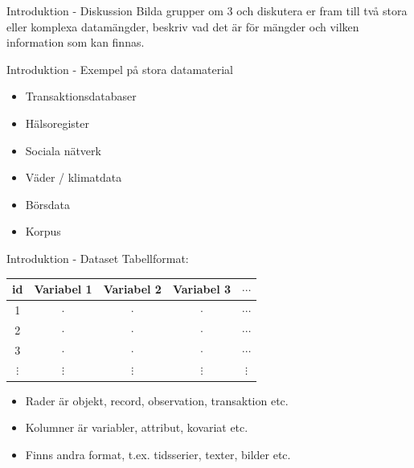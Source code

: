 \documentclass[10pt,english]{beamer}
\begin{document}
\begin{frame}{Introduktion - Diskussion}
    Bilda grupper om 3 och diskutera er fram till två stora eller komplexa datamängder, beskriv vad det är för mängder och vilken information som kan finnas.
\end{frame}

\begin{frame}{Introduktion - Exempel på stora datamaterial}
    \begin{itemize}
        \item Transaktionsdatabaser
        \item Hälsoregister
        \item Sociala nätverk
        \item Väder / klimatdata
        \item Börsdata
        \item Korpus
    \end{itemize}
\end{frame}

\begin{frame}{Introduktion - Dataset}
    Tabellformat:\\
    \begin{tabular}{|c|c|c|c|c|}
        \hline
        id & Variabel 1 & Variabel 2 & Variabel 3 &  $\cdots$ \\ \hline \hline
        1 & $\cdot$ & $\cdot$ & $\cdot$ & $\cdots$ \\ \hline
        2 & $\cdot$ & $\cdot$ & $\cdot$ & $\cdots$ \\ \hline
        3 & $\cdot$ & $\cdot$ & $\cdot$ & $\cdots$ \\ \hline
        $\vdots$ & $\vdots$ & $\vdots$ & $\vdots$ & $\vdots$ \\ \hline
    \end{tabular}
    \begin{itemize}
        \item Rader är objekt, record, observation, transaktion etc.
        \item Kolumner är variabler, attribut, kovariat etc.
        \item Finns andra format, t.ex. tidsserier, texter, bilder etc.
    \end{itemize}
\end{frame}
\end{document}

